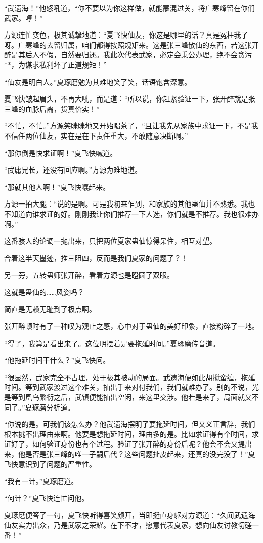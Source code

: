 \begin{this_body}
“武遗海！”他怒吼道，“你不要以为你这样做，就能蒙混过关，将广寒峰留在你们武家。哼！”

方源连忙变色，极其诚挚地道：“夏飞快仙友，你这是哪里的话？真是冤枉我了呀。广寒峰的去留归属，咱们都得按照规矩来。这是张三峰散仙的东西，若这张开醉是其后人不假，自然要归还。我此次代表武家，必定会秉公办理，绝不会贪污**，为谋求私利坏了正道规矩！”

“仙友是明白人。”夏琢磨勉为其难地笑了笑，话语饱含深意。

夏飞快皱起眉头，不再大吼，而是道：“所以说，你赶紧验证一下，张开醉就是张三峰的血脉后裔，货真价实！”

“不忙，不忙。”方源笑眯眯地又开始喝茶了，“且让我先从家族中求证一下，不是我不信任两位仙友，实在是在下责任重大，不敢随意决断啊。”

“那你倒是快求证啊！”夏飞快喊道。

“武庸兄长，还没有回应啊。”方源为难地道。

“那就其他人啊！”夏飞快嚷起来。

方源一拍大腿：“说的是啊。可是我初来乍到，和家族的其他蛊仙并不熟悉。我也不知道向谁求证的好。刚刚我让你们推荐一下人选，你们就是不推荐。我也很难办啊。”

这番骇人的论调一抛出来，只把两位夏家蛊仙惊得呆住，相互对望。

合着这半天墨迹，推三阻四，反而是我们夏家的问题了？！

另一旁，五转蛊师张开醉，看着方源也是瞪圆了双眼。

这就是蛊仙的……风姿吗？

简直是无赖无耻到了极点啊。

张开醉顿时有了一种叹为观止之感，心中对于蛊仙的美好印象，直接粉碎了一地。

“得了，我算是看出来了。这位明摆着是要拖延时间。”夏琢磨传音道。

“他拖延时间干什么？”夏飞快问。

“很显然，武家完全不占理，处于极其被动的局面。武遗海便如此胡搅蛮缠，拖延时间。等到武家渡过这个难关，抽出手来对付我们，我们就难办了。别的不说，光是等到凰鸟繁衍之后，武镇便能抽出空闲，来这里交涉。他若是来了，局面就又不同了。”夏琢磨分析道。

“你说的是。可我们该怎么办？他武遗海摆明了要拖延时间，但又义正言辞，我们根本挑不出理由来啊。他要是想拖延时间，理由多的是。比如求证得有个时间，求证好了，如何验证身份也有个过程。验证了张开醉的身份后呢？他会不会又提出来，他是否是张三峰的唯一子嗣后代？这些问题扯皮起来，还真的没完没了！”夏飞快意识到了问题的严重性。

“我有一计。”夏琢磨道。

“何计？”夏飞快连忙问他。

夏琢磨便答了一句，夏飞快听得喜笑颜开，当即挺直身躯对方源道：“久闻武遗海仙友实力出众，乃是武家之荣耀。在下不才，愿意代表夏家，想向仙友讨教切磋一番！”

\end{this_body}

